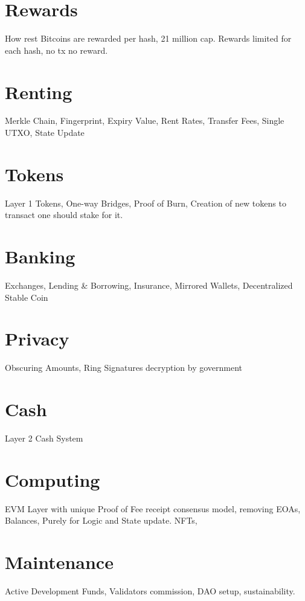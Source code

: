 \documentclass[a4paper,11pt]{article}
\begin{document}
\section{Rewards}
How rest Bitcoins are rewarded per hash, 21 million cap. Rewards limited for each hash, no tx no reward.

\section{Renting}
Merkle Chain, Fingerprint, Expiry Value, Rent Rates, Transfer Fees, Single UTXO, State Update

\section{Tokens}
Layer 1 Tokens, One-way Bridges, Proof of Burn, Creation of new tokens to transact one should stake for it.

\section{Banking}
Exchanges, Lending \& Borrowing, Insurance, Mirrored Wallets, Decentralized Stable Coin

\section{Privacy}
Obscuring Amounts, Ring Signatures decryption by government

\section{Cash}
Layer 2 Cash System 

\section{Computing}
EVM Layer with unique Proof of Fee receipt consensus model, removing EOAs, Balances, Purely for Logic and State update. NFTs, 

\section{Maintenance}
Active Development Funds, Validators commission, DAO setup, sustainability.

\end{document}
